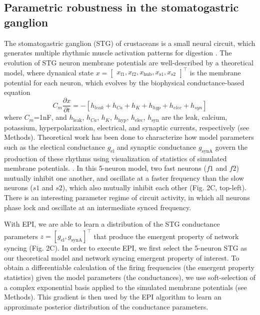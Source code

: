 \documentclass[11pt]{article}
\begin{document}
\subsection{Parametric robustness in the stomatogastric ganglion}
The stomatogastric ganglion (STG) of crustaceans is a small neural circuit, which generates multiple rhythmic muscle activation patterns for digestion \cite{marder}. The evolution of STG neuron membrane potentials are well-described by a theoretical model, where dynanical state $x = \begin{bmatrix} x_{\text{f1}}, x_{\text{f2}}, x_{\text{hub}}, x_{\text{s1}}, x_{\text{s2}} \end{bmatrix}^\top$ is the membrane potential for each neuron, which evolves by the biophysical conductance-based equation
\begin{equation} C_m \frac{\partial x}{\partial t} = - \left[ h_{leak} + h_{Ca} + h_K + h_{hyp} + h_{elec} + h_{syn}\right] 
\end{equation} 
where $C_m$=1nF, and $h_{\text{leak}}$, $h_{Ca}$, $h_K$, $h_{\text{hyp}}$, $h_{\text{elec}}$, $h_{\text{syn}}$ are the leak, calcium, potassium, hyperpolarization, electrical, and synaptic currents, respectively (see Methods).
Theoretical work has been done to characterize how model parameters such as the electical conductance $g_{\text{el}}$ and synaptic conductance $g_{\text{synA}}$ govern the production of these rhythms using visualization of statistics of simulated membrane potentials. \cite{gutierrez2013multiple}.  In this 5-neuron model,  two fast neurons ($f1$ and $f2$) mutually inhibit one another, and oscillate at a faster frequency than the slow neurons ($s1$ and $s2$), which also mutually inhibit each other  (Fig. 2C, top-left).   There is an interesting parameter regime of circuit activity, in which all neurons phase lock and oscillate at an intermediate synced frequency.

With EPI, we are able to learn a distribution of the STG conductance parameters $z = \left[g_{\text{el}}, g_{\text{synA}} \right]^\top$  that produce the emergent property of network syncing (Fig. 2C).  In order to execute EPI, we first select the 5-neuron STG as our theoretical model and network syncing emergent property of interest. To obtain a differentiable calculation of the firing frequencies (the emergent property statistics) given the model parameters (the conductances), we use soft-selection of a complex exponential basis applied to the simulated membrane potentials (see Methods).  This gradient is then used by the EPI algorithm to learn an approximate posterior distribution of the conductance parameters.
\end{document}
